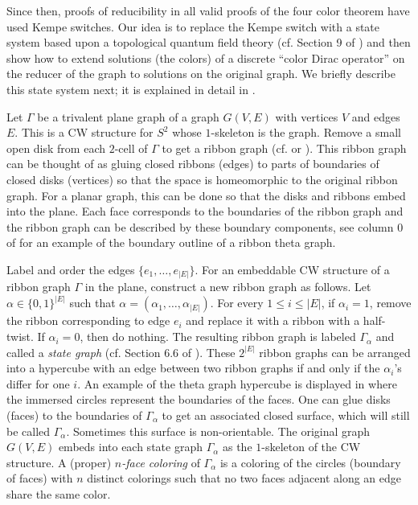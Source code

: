 \documentclass[12pt]{amsart}
\theoremstyle{definition}
\theoremstyle{remark}
\numberwithin{equation}{section}
\begin{document}
Since then, proofs of reducibility in all valid proofs of the four color theorem have used Kempe switches. Our idea is to replace the Kempe switch with a state system based upon a topological quantum field theory (cf. Section 9 of \cite{BMcC}) and then show how to extend solutions  (the colors) of a discrete ``color Dirac operator'' on the reducer of the graph to solutions on the original graph. We briefly describe this state system next; it is explained in detail in \cite{BMcC}.

Let $\Gamma$ be a trivalent plane graph of a graph $G(V,E)$ with vertices $V$ and edges $E$. This is a CW structure for $S^2$ whose $1$-skeleton is the graph.  Remove a small open disk from each $2$-cell of $\Gamma$ to get a ribbon graph (cf. \cite{BMcC} or \cite{Moffat2013}). This ribbon graph can be thought of as gluing closed ribbons (edges) to parts of boundaries of closed disks (vertices) so that the space is homeomorphic to the original ribbon graph.  For a planar graph, this can be done so that the disks and ribbons embed into the plane.  Each face corresponds to the boundaries of the ribbon graph and the ribbon graph can be described by these boundary components, see column $0$ of  for an example of the boundary outline of a ribbon theta graph. 


Label and order the edges $\{e_1, \ldots, e_{|E|}\}$.  For an embeddable CW structure of a ribbon graph $\Gamma$ in the plane, construct a new ribbon graph as follows. Let  $\alpha \in \{0,1\}^{|E|}$ such that $\alpha=(\alpha_1,\ldots, \alpha_{|E|})$. For every $1\leq i \leq |E|$, if $\alpha_i=1$, remove the ribbon corresponding to edge $e_i$ and replace it with a ribbon with a half-twist. If $\alpha_i=0$, then do nothing.  The resulting ribbon graph is labeled $\Gamma_\alpha$ and called a {\em state graph} (cf. Section 6.6 of \cite{BMcC}).   These $2^{|E|}$ ribbon graphs can be arranged into a hypercube with an edge between two ribbon graphs if and only if the $\alpha_i$'s differ for one $i$. An example of the theta graph hypercube is displayed in  where the immersed circles represent the boundaries of the faces. One can glue disks (faces) to the boundaries of $\Gamma_\alpha$ to get an associated closed surface, which will still be called  $\Gamma_\alpha$. Sometimes this surface is non-orientable. The original graph $G(V,E)$ embeds into each state graph $\Gamma_\alpha$ as the $1$-skeleton of the CW structure. A (proper) {\em $n$-face coloring} of $\Gamma_\alpha$ is a coloring of the circles (boundary of faces) with $n$ distinct colorings such that no two faces adjacent along an edge share the same color.
\end{document}
